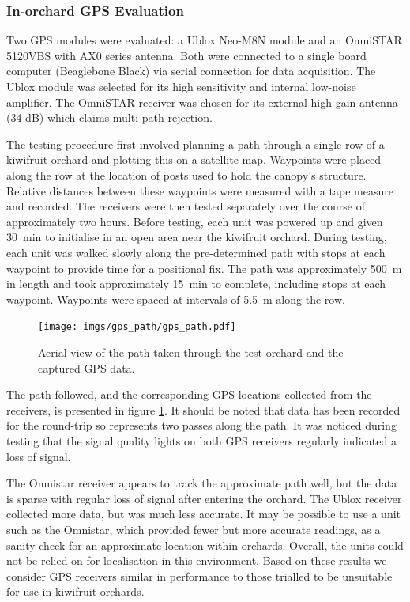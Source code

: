 \documentclass[preprint,authoryear,12pt]{elsarticle}
\begin{document}
    \subsubsection{In-orchard GPS Evaluation}
        Two GPS modules were evaluated: a Ublox Neo-M8N module and an OmniSTAR 5120VBS with AX0 series antenna.
    	Both were connected to a single board computer (Beaglebone Black) via serial connection for data acquisition.
        The Ublox module was selected for its high sensitivity and internal low-noise amplifier.
        The OmniSTAR receiver was chosen for its external high-gain antenna (34 dB) which claims multi-path rejection.

        The testing procedure first involved planning a path through a single row of a kiwifruit orchard and plotting this on a satellite map.
        Waypoints were placed along the row at the location of posts used to hold the canopy's structure.
        Relative distances between these waypoints were measured with a tape measure and recorded.
        The receivers were then tested separately over the course of approximately two hours.
        Before testing, each unit was powered up and given \SI{30}{\minute} to initialise in an open area near the kiwifruit orchard.
        During testing, each unit was walked slowly along the pre-determined path with stops at each waypoint to provide time for a positional fix.
        The path was approximately \SI{500}{\meter} in length and took approximately \SI{15}{\minute} to complete, including stops at each waypoint.
        Waypoints were spaced at intervals of \SI{5.5}{\meter} along the row.

        \begin{figure}[htb]
            \centering
            \texttt{[image: imgs/gps\_path/gps\_path.pdf]}
            \caption{
                Aerial view of the path taken through the test orchard and the captured GPS data.
            }
            \label{fig:gpsResults}
        \end{figure}

        The path followed, and the corresponding GPS locations collected from the receivers, is presented in figure \ref{fig:gpsResults}.
        It should be noted that data has been recorded for the round-trip so represents two passes along the path.
        It was noticed during testing that the signal quality lights on both GPS receivers regularly indicated a loss of signal.

        The Omnistar receiver appears to track the approximate path well, but the data is sparse with regular loss of signal after entering the orchard.
    	The Ublox receiver collected more data, but was much less accurate.
        It may be possible to use a unit such as the Omnistar, which provided fewer but more accurate readings, as a sanity check for an approximate location within orchards.
        Overall, the units could not be relied on for localisation in this environment.
        Based on these results we consider GPS receivers similar in performance to those trialled to be unsuitable for use in kiwifruit orchards.
\end{document}
